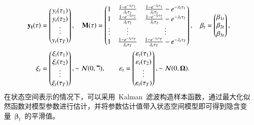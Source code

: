 \begin{align*}
\mathbf{y_t(\tau)} &=
  \begin{pmatrix}
    y_t(\tau_1) \\
    y_t(\tau_2) \\
    \vdots \\
    y_t(\tau_T) \\
  \end{pmatrix},\quad
  \mathcal{\mathbf{M}}(\mathbf{\tau}) =
  \begin{pmatrix}
    1 & \frac{1-e^{-\lambda_{t} \tau_1}} {\lambda_{t} \tau_1} & \frac{1-e^{-\lambda_{t} \tau_1}} {\lambda_{t} \tau_1} - e^{-\lambda_{t} \tau_1} \\
    1 & \frac{1-e^{-\lambda_{t} \tau_2}} {\lambda_{t} \tau_2} & \frac{1-e^{-\lambda_{t} \tau_2}} {\lambda_{t} \tau_2} - e^{-\lambda_{t} \tau_2} \\
\vdots    & \vdots &  \vdots\\
    1 & \frac{1-e^{-\lambda_{t} \tau_T}} {\lambda_{t} \tau_T} & \frac{1-e^{-\lambda_{t} \tau_T}} {\lambda_{t} \tau_T} - e^{-\lambda_{t} \tau_T} \\
  \end{pmatrix},\quad
   \mathbf{\beta}_t =
  \begin{pmatrix}
    \beta_{1t} \\
    \beta_{2t} \\
    \beta_{3t} \\
  \end{pmatrix},\\
 \mathbf{\xi}_t &=
    \begin{pmatrix}
    \xi_{t}(\tau_1) \\
    \xi_{t} (\tau_2)\\
    \vdots                  \\
    \xi_{t}(\tau_T) \\
  \end{pmatrix},\sim \mathcal{N}(0,\mathbf{\daleth}),\qquad
 \mathbf{\varepsilon}_t =
    \begin{pmatrix}
    \varepsilon_{t}(\tau_1) \\
    \varepsilon_{t} (\tau_2)\\
    \vdots                  \\
    \varepsilon_{t}(\tau_T) \\
  \end{pmatrix},\sim \mathcal{N}(0,\mathbf{\Omega}).
\end{align*}
在状态空间表示的情况下，可以采用~Kalman~滤波构造样本函数，通过最大化似然函数对模型参数进行估计，并将参数估计值带入状态空间模型即可得到隐含变量~$\mathbf{\beta}_t$~的平滑值。

